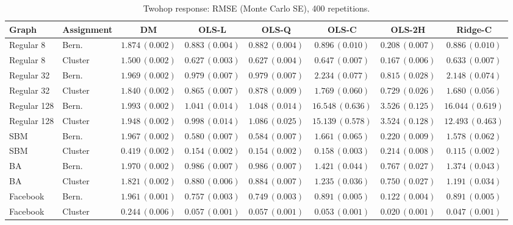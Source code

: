 \begin{table}[t]
\centering\scriptsize
\caption{Twohop response: RMSE (Monte Carlo SE), 400 repetitions.}
\begin{tabular}{llcccccc}
\toprule
Graph & Assignment & DM & OLS-L & OLS-Q & OLS-C & OLS-2H & Ridge-C \\
\midrule
Regular 8 & Bern. & $1.874\,(0.002)$ & $0.883\,(0.004)$ & $0.882\,(0.004)$ & $0.896\,(0.010)$ & $0.208\,(0.007)$ & $0.886\,(0.010)$ \\
Regular 8 & Cluster & $1.500\,(0.002)$ & $0.627\,(0.003)$ & $0.627\,(0.004)$ & $0.647\,(0.007)$ & $0.167\,(0.006)$ & $0.633\,(0.007)$ \\
Regular 32 & Bern. & $1.969\,(0.002)$ & $0.979\,(0.007)$ & $0.979\,(0.007)$ & $2.234\,(0.077)$ & $0.815\,(0.028)$ & $2.148\,(0.074)$ \\
Regular 32 & Cluster & $1.840\,(0.002)$ & $0.865\,(0.007)$ & $0.878\,(0.009)$ & $1.769\,(0.060)$ & $0.729\,(0.026)$ & $1.680\,(0.056)$ \\
Regular 128 & Bern. & $1.993\,(0.002)$ & $1.041\,(0.014)$ & $1.048\,(0.014)$ & $16.548\,(0.636)$ & $3.526\,(0.125)$ & $16.044\,(0.619)$ \\
Regular 128 & Cluster & $1.948\,(0.002)$ & $0.998\,(0.014)$ & $1.086\,(0.025)$ & $15.139\,(0.578)$ & $3.524\,(0.128)$ & $12.493\,(0.463)$ \\
SBM & Bern. & $1.967\,(0.002)$ & $0.580\,(0.007)$ & $0.584\,(0.007)$ & $1.661\,(0.065)$ & $0.220\,(0.009)$ & $1.578\,(0.062)$ \\
SBM & Cluster & $0.419\,(0.002)$ & $0.154\,(0.002)$ & $0.154\,(0.002)$ & $0.158\,(0.003)$ & $0.214\,(0.008)$ & $0.115\,(0.002)$ \\
BA & Bern. & $1.970\,(0.002)$ & $0.986\,(0.007)$ & $0.986\,(0.007)$ & $1.421\,(0.044)$ & $0.767\,(0.027)$ & $1.374\,(0.043)$ \\
BA & Cluster & $1.821\,(0.002)$ & $0.880\,(0.006)$ & $0.884\,(0.007)$ & $1.235\,(0.036)$ & $0.750\,(0.027)$ & $1.191\,(0.034)$ \\
Facebook & Bern. & $1.961\,(0.001)$ & $0.757\,(0.003)$ & $0.749\,(0.003)$ & $0.891\,(0.005)$ & $0.122\,(0.004)$ & $0.891\,(0.005)$ \\
Facebook & Cluster & $0.244\,(0.006)$ & $0.057\,(0.001)$ & $0.057\,(0.001)$ & $0.053\,(0.001)$ & $0.020\,(0.001)$ & $0.047\,(0.001)$ \\
\bottomrule
\end{tabular}
\end{table}